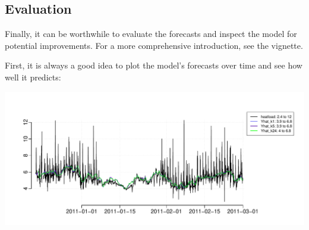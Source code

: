 \subsection{Evaluation}\label{subsec:evaluation}

Finally, it can be worthwhile to evaluate the forecasts and inspect the model for potential improvements. For a more comprehensive introduction, see the
 vignette.

\noindent First, it is always a good idea to plot the model's forecasts over time and see how well it predicts:
\begin{knitrout}
\color{fgcolor}\begin{kframe}
\begin{alltt}
\hlopt{\$} \hlkwb{<-} \hlopt{\$}
\hlstd{(}\hlopt{\$} \hlstd{,} \hlstd{=}\hlstd{(}\hlstd{,}\hlstd{,}\hlstd{),} 
\end{alltt}
\end{kframe}
\includegraphics[width=1\linewidth]{tmp/genfig/unnamed-chunk-31-1} 
\end{knitrout}


